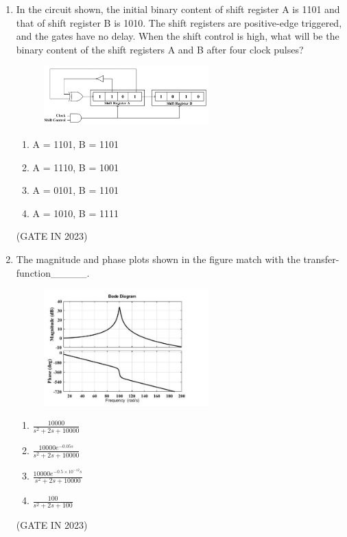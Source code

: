 \documentclass[journal]{IEEEtran}
\begin{document}
\begin{enumerate}
    \item In the circuit shown, the initial binary content of shift register A is 1101 and that of shift register B is 1010. The shift registers are positive-edge triggered, and the gates have no delay. When the shift control is high, what will be the binary content of the shift registers A and B after four clock pulses?
    \begin{figure}[H]
    \centering
      \includegraphics[width=0.6\textwidth]{21.png} 
      \caption{}
    \label{fig:fig21} 
\end{figure}
    \begin{enumerate}
        \item A = 1101, B = 1101
        \item A = 1110, B = 1001
        \item A = 0101, B = 1101
        \item A = 1010, B = 1111
    \end{enumerate}
    \hfill(GATE IN 2023)

    \item The magnitude and phase plots shown in the figure match with the transfer-function\_\_\_\_\_.
    \begin{figure}[H]
    \centering
      \includegraphics[width=0.6\textwidth]{22.png} 
      \caption{}
    \label{fig:fig22} 
\end{figure}
    \begin{enumerate}
        \item $\frac{10000}{s^2 + 2s + 10000}$
        \item $\frac{10000 e^{-0.05s}}{s^2 + 2s + 10000}$
        \item $\frac{10000 e^{-0.5 \times 10^{-12}s}}{s^2 + 2s + 10000}$
        \item $\frac{100}{s^2 + 2s + 100}$
    \end{enumerate}
    \hfill(GATE IN 2023)


\end{enumerate}
\end{document}
